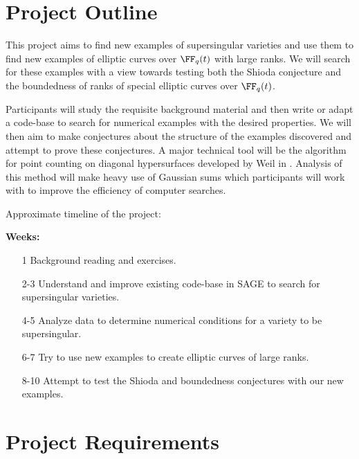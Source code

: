 \documentclass[12pt]{article}
\begin{document}
\section{Project Outline}

This project aims to find new examples of supersingular varieties and use them to find new examples of elliptic curves over $\FF_q(t)$ with large ranks. We will search for these examples with a view towards testing both the Shioda conjecture and the boundedness of ranks of special elliptic curves over $\FF_q(t)$.
\bigskip \par
Participants will study the requisite background material and then write or adapt a code-base to search for numerical examples with the desired properties. We will then aim to make conjectures about the structure of the examples discovered and attempt to prove these conjectures. A major technical tool will be the algorithm for point counting on diagonal hypersurfaces developed by Weil in \cite{weil}. Analysis of this method will make heavy use of Gaussian sums which participants will work with to improve the efficiency of computer searches. 
\begin{center}
Approximate timeline of the project:
\end{center}
\textbf{Weeks:}
\begin{enumerate}
\item[1] Background reading and exercises.
\item[2-3] Understand and improve existing code-base in SAGE to search for supersingular varieties.
\item[4-5] Analyze data to determine numerical conditions for a variety to be supersingular. 
\item[6-7] Try to use new examples to create elliptic curves of large ranks.
\item[8-10] Attempt to test the Shioda and boundedness conjectures with our new examples.
\end{enumerate}

\section{Project Requirements}
\end{document}
